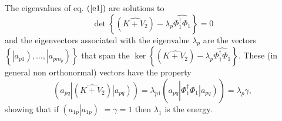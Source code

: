 \documentclass[aps,preprint]{revtex4}%
\begin{document}
The eigenvalues of eq. $\left(  \ref{e1}\right)  $ are solutions to
\begin{equation}
\det\left\{  \left(  \widehat{K+V_{2}}\right)  -\lambda_{p}\widehat{\Phi
_{1}^{\dagger}\Phi_{1}}\right\}  =0
\end{equation}
and the eigenvectors associated with the eigenvalue $\lambda_{p}$ are the
vectors $\left\{  \left\vert \overset{}{a_{p1}}\right)  ,\ldots,\left\vert
\overset{}{a_{pm_{p}}}\right)  \right\}  $ that span the $\ker\left\{  \left(
\widehat{K+V_{2}}\right)  -\lambda_{p}\widehat{\Phi_{1}^{\dagger}\Phi_{1}%
}\right\}  $. These (in general non orthonormal) vectors have the property
\begin{equation}
\left(  \overset{}{a_{pq}}\left\vert \left(  \widehat{K+V_{2}}\right)
\right.  \left\vert \overset{}{a_{pq}}\right)  \right)  =\lambda_{p1}\left(
\overset{}{a_{pq}}\left\vert \widehat{\Phi_{1}^{\dagger}\Phi_{1}}\right.
\left\vert \overset{}{a_{pq}}\right)  \right)  =\lambda_{p}\gamma,
\end{equation}
showing that if $\left(  \left.  \overset{}{a_{1p}}\right\vert
\overset{}{a_{1p}}\right)  $ $=\gamma=1$ then $\lambda_{1}$ is the energy.
\end{document}
